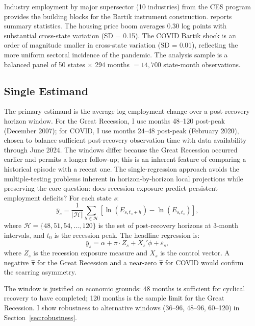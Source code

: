 \documentclass[12pt]{article}
\begin{document}
Industry employment by major supersector (10 industries) from the CES program provides the building blocks for the Bartik instrument construction. 
 reports summary statistics. The housing price boom averages 0.30 log points with substantial cross-state variation (SD = 0.15). The COVID Bartik shock is an order of magnitude smaller in cross-state variation (SD = 0.01), reflecting the more uniform sectoral incidence of the pandemic. The analysis sample is a balanced panel of 50 states $\times$ 294 months $= 14{,}700$ state-month observations.



\subsection{Single Estimand}

The primary estimand is the average log employment change over a post-recovery horizon window. For the Great Recession, I use months 48--120 post-peak (December 2007); for COVID, I use months 24--48 post-peak (February 2020), chosen to balance sufficient post-recovery observation time with data availability through June 2024. The windows differ because the Great Recession occurred earlier and permits a longer follow-up; this is an inherent feature of comparing a historical episode with a recent one. The single-regression approach avoids the multiple-testing problems inherent in horizon-by-horizon local projections while preserving the core question: does recession exposure predict persistent employment deficits? For each state $s$:
\begin{equation}
\bar{y}_s = \frac{1}{|\mathcal{H}|} \sum_{h \in \mathcal{H}} \left[ \ln(E_{s,t_0+h}) - \ln(E_{s,t_0}) \right],
\end{equation}
where $\mathcal{H} = \{48, 51, 54, \ldots, 120\}$ is the set of post-recovery horizons at 3-month intervals, and $t_0$ is the recession peak. The headline regression is:
\begin{equation}
\bar{y}_s = \alpha + \pi \cdot Z_s + X_s'\phi + \varepsilon_s,
\label{eq:main}
\end{equation}
where $Z_s$ is the recession exposure measure and $X_s$ is the control vector. A negative $\hat{\pi}$ for the Great Recession and a near-zero $\hat{\pi}$ for COVID would confirm the scarring asymmetry.

The window is justified on economic grounds: 48 months is sufficient for cyclical recovery to have completed; 120 months is the sample limit for the Great Recession. I show robustness to alternative windows (36--96, 48--96, 60--120) in Section~\ref{sec:robustness}.
\end{document}
